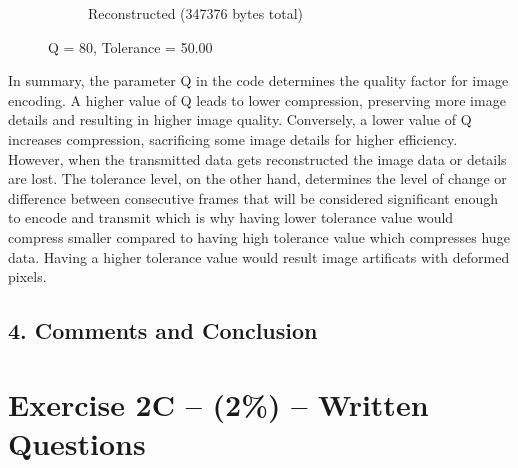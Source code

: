 \documentclass{article}
\begin{document}
\begin{figure}[ht]
\begin{subfigure}[t]{0.45\textwidth}
			\caption{Reconstructed (347376 bytes total)}
			\label{fig:2B_Tolerance50Reconstructed}

		\end{subfigure}

		\caption{Q = 80, Tolerance = 50.00}
		\label{fig:2B_Tolerance50}
	\end{figure}

	In summary, the parameter Q in the code determines the quality factor for image encoding. A higher value of Q leads to lower compression, preserving more image details and resulting in 
	higher image quality. Conversely, a lower value of Q increases compression, sacrificing some image details for higher efficiency. However, when the transmitted data gets reconstructed 
	the image data or details are lost. The tolerance level, on the other hand, determines the level of change or difference between consecutive frames that will be considered significant 
	enough to encode and transmit which is why having lower tolerance value would compress smaller compared to having high tolerance value which compresses huge data. Having a higher tolerance
	value would result image artificats with deformed pixels.


	\subsection*{4. Comments and Conclusion}



	
	\vspace{0.5cm}
	\clearpage
	\newpage
	\section*{Exercise 2C -- (2\%) -- Written Questions }
	
\end{document}
